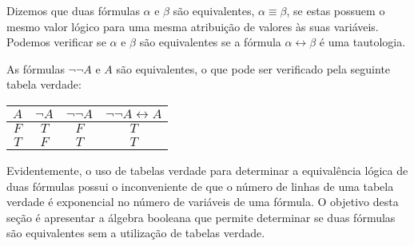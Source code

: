 \begin{Definition}
Dizemos que duas
fórmulas $\alpha$ e $\beta$ são equivalentes, $\alpha \equiv \beta$, se estas possuem o mesmo valor lógico para
uma mesma atribuição de valores às suas variáveis. Podemos verificar
se $\alpha$ e $\beta$ são equivalentes se a
fórmula $\alpha\leftrightarrow\beta$ é uma tautologia.
\end{Definition}

\begin{Example}
As fórmulas $\neg \neg A$ e $A$ são equivalentes,
o que pode ser verificado pela seguinte tabela verdade:
\begin{table}[h]
  \begin{tabular}{|c|c|c|c|} \hline
      $A$ & $\neg A$ & $\neg \neg A$ & $\neg\neg A\leftrightarrow A$
      \\ \hline
      $F$ & $T$ & $F$ & $T$\\
      $T$ & $F$ & $T$ & $T$ \\ \hline
   \end{tabular}
   \centering
\end{table}
\end{Example}
Evidentemente, o uso de tabelas verdade para determinar a equivalência
lógica de duas fórmulas possui o inconveniente de que o número de
linhas de uma tabela verdade é exponencial no número de variáveis de
uma fórmula. O objetivo desta seção é apresentar a álgebra booleana
que permite determinar se duas fórmulas são equivalentes sem a
utilização de tabelas verdade.

